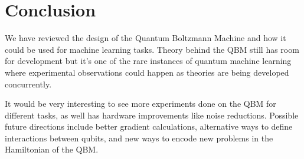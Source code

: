 \documentclass[letterpaper,11pt]{article}
\begin{document}
\section{Conclusion}
We have reviewed the design of the Quantum Boltzmann Machine and how it could be used for machine learning tasks. Theory behind the QBM still has room for development but it's one of the rare instances of quantum machine learning where experimental observations could happen as theories are being developed concurrently. \par

It would be very interesting to see more experiments done on the QBM for different tasks, as well has hardware improvements like noise reductions. Possible future directions include better gradient calculations, alternative ways to define interactions between qubits, and new ways to encode new problems in the Hamiltonian of the QBM. 




\end{document}
